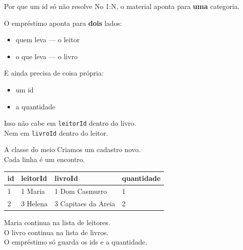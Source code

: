 \documentclass[aspectratio=169,11pt]{beamer}
\begin{document}
\begin{frame}{Por que um id só não resolve}
  No 1{:}N, o material aponta para \textbf{uma} categoria.

  \vspace{0.5em}
  O empréstimo aponta para \textbf{dois} lados:
  \begin{itemize}
    \item quem leva --- o leitor
    \item o que leva --- o livro
  \end{itemize}

  \vspace{0.5em}
  E ainda precisa de coisa própria:
  \begin{itemize}
    \item um id
    \item a quantidade
  \end{itemize}

  \vspace{0.4em}
  Isso não cabe em \texttt{leitorId} dentro do livro.\\
  Nem em \texttt{livroId} dentro do leitor.
\end{frame}

\begin{frame}{A classe do meio}
  Criamos um cadastro novo.\\
  Cada linha é um encontro.

  \vspace{0.4em}
  \begin{center}
  \begin{tabular}{llll}
    \toprule
    id & leitorId & livroId & quantidade \\
    \midrule
    1 & 1 Maria & 1 Dom Casmurro & 1 \\
    2 & 3 Helena & 3 Capitaes da Areia & 2 \\
    \bottomrule
  \end{tabular}
  \end{center}

  \vspace{0.5em}
  Maria continua na lista de leitores.\\
  O livro continua na lista de livros.\\
  O empréstimo só guarda os ids e a quantidade.
\end{frame}
\end{document}
